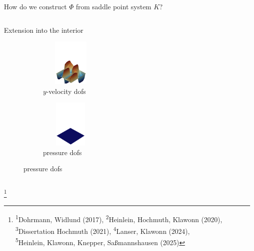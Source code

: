 \begin{frame}{How do we construct $\varPhi$ from saddle point system $K$?}
\begin{columns}
\begin{column}{0.52\textwidth}
{\begin{block}{\normalsize Extension into the interior}
\begin{figure}
						\vfill
						\hspace*{-12mm}
						\begin{subfigure}{0.29\textwidth}
							\centering
							\vspace*{-3mm}
							\includegraphics[width=3cm,height=23mm]{images/RGDSW-y-cut.png}
							\vspace*{-5mm}
							\caption{$y$-velocity dofs}
						\end{subfigure}
						\hspace{12mm}
						\begin{subfigure}{0.29\textwidth}
							\centering
							\vspace*{-3mm}
							\includegraphics[width=3cm,height=23mm]{images/RGDSW-p-cut-zero.png}
							\vspace*{-5mm}
							\caption{pressure dofs}
						\end{subfigure}
					\end{figure}
					\vspace{-4mm}
				\end{block}
			}
		\end{column}
	\end{columns}
	{\let\thefootnote\relax\footnote{{\tiny \!\!\!\!\textsuperscript{1}Dohrmann, Widlund (2017), \textsuperscript{2}Heinlein, Hochmuth, Klawonn (2020),  \textsuperscript{3}Dissertation Hochmuth (2021),  \textsuperscript{4}Lanser, Klawonn (2024),\\\hspace{3em}\!\!\!\!\!\!\textsuperscript{5}Heinlein, Klawonn, Knepper, Saßmannshausen (2025)}}}
\end{frame}
\setcounter{footnote}{5}
